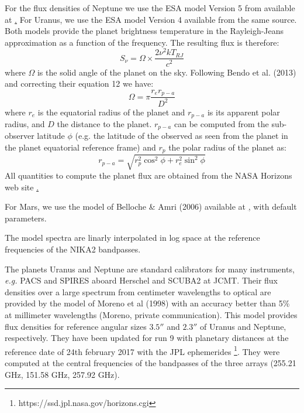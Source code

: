 For the flux densities of Neptune we use the ESA model Version 5 from
available at
\href{https://www.cosmos.esa.int/web/herschel/calibrator-models}. For
Uranus, we use the ESA model Version 4 available from the same
source. 
Both models provide the planet brightness temperature in the
Rayleigh-Jeans approximation as a function of
the frequency. The resulting flux is therefore:
\begin{equation}
S_{\nu} = \Omega \times \frac{2 \nu^{2} k T_{RJ}}{c^2}
\end{equation}
where $\Omega$ is the solid angle of the planet on the sky. Following
Bendo et al. (2013) and correcting their equation 12 we have:
\begin{equation}
\Omega = \pi \frac{r_{e} r_{p-a}}{D^{2}} 
\end{equation}
where $r_{e}$ is the equatorial radius of the planet and $r_{p-a}$ is
its apparent polar radius, and $D$ the distance to the
planet. $r_{p-a}$ can be computed from the sub-observer latitude $\phi$
(e.g. the latitude of the observed as seen from the planet in the
planet equatorial reference frame) and $r_{p}$ the polar radius of the
planet as:
\begin{equation}
r_{p-a} = \sqrt{r_{p}^2 \cos^{2}\phi + r_{e}^2 \sin^{2} \phi}
\end{equation}
All quantities to compute the planet flux are obtained from the NASA
Horizons web site \href{}. 

For Mars, we use the model of Belloche \&  Amri (2006) available at
\href{http://www.lesia.obspm.fr/perso/emmanuel-lellouch/mars/index.php},
with default parameters.

 
The model spectra are linarly interpolated in log space at the
reference frequencies of the NIKA2 bandpasses.







The planets Uranus and Neptune are standard calibrators for many instruments,
{\it e.g.} PACS and SPIRES aboard Herschel and SCUBA2 at JCMT.
Their flux densities over a large spectrum from centimeter wavelengths to optical
are provided by the model of Moreno et al (1998) with an accuracy better than
5\% at millimeter wavelengths (Moreno, private communication). This model provides
flux densities for reference angular sizes $3.5''$
and $2.3''$ of Uranus and Neptune, respectively. They have been updated for run 9
with planetary distances at the reference date of 24th february 2017 with 
the JPL ephemerides \footnote{https://ssd.jpl.nasa.gov/horizons.cgi}.
They were computed at the central frequencies of the bandpasses of
the three arrays (255.21 GHz, 151.58 GHz, 257.92 GHz).

